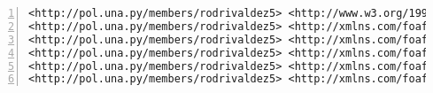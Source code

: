 \noindent\begin{minipage}{\textwidth}
\begin{lstlisting}[captionpos=b, caption=Ejemplo en RDF/N-Quads, label=lst:ValdezRDF,  numbers=left,  numberstyle=\tiny\color{mygray},frame=single]
<http://pol.una.py/members/rodrivaldez5> <http://www.w3.org/1999/02/22-rdf-syntax-ns#type> <http://xmlns.com/foaf/0.1/Person> .
<http://pol.una.py/members/rodrivaldez5> <http://xmlns.com/foaf/0.1/family_name> "Valdez" .
<http://pol.una.py/members/rodrivaldez5> <http://xmlns.com/foaf/0.1/givenname> "Rodrigo" .
<http://pol.una.py/members/rodrivaldez5> <http://xmlns.com/foaf/0.1/name> "Rodrigo Valdez"@en .
<http://pol.una.py/members/rodrivaldez5> <http://xmlns.com/foaf/0.1/nick> "Rodri" .
<http://pol.una.py/members/rodrivaldez5> <http://xmlns.com/foaf/0.1/title> "Software Developer" .

\end{lstlisting}
\end{minipage}







